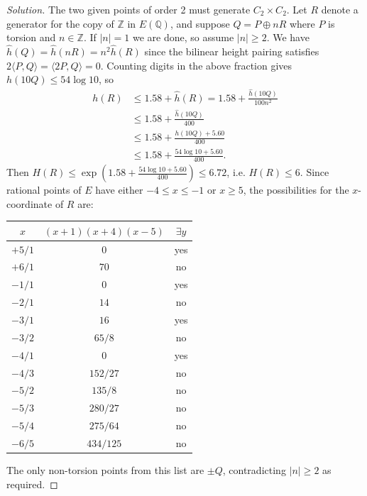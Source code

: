 \documentclass[a4paper]{article}
\theoremstyle{definition}
\newcommand{\Z}{\mathbb{Z}}
\newcommand{\Q}{\mathbb{Q}}
\begin{document}
\begin{enumerate}
        \begin{proof}[Solution]
            The two given points of order 2 must generate $C_2\times C_2$. Let
            $R$ denote a generator for the copy of $\Z$ in $E(\Q)$, and suppose
            $Q=P\oplus nR$ where $P$ is torsion and $n\in\Z$. If $|n|=1$ we are
            done, so assume $|n|\ge2$. We have
            $\hat h(Q)=\hat h(nR)=n^2\hat h(R)$ since the bilinear height
            pairing satisfies $2\langle P,Q\rangle=\langle2P,Q\rangle=0$.
            Counting digits in the above fraction gives $h(10Q)\le54\log10$, so
            \begin{align*}
                h(R)
                    &\le 1.58 + \hat h(R)
                    = 1.58 + \frac{\hat h(10Q)}{100n^2} \\
                    &\le 1.58 + \frac{\hat h(10Q)}{400} \\
                    &\le 1.58 + \frac{h(10Q) + 5.60}{400} \\
                    &\le 1.58 + \frac{54\log10+5.60}{400}.
            \end{align*}
            Then $H(R)\le\exp(1.58+\frac{54\log10+5.60}{400})\le6.72$, i.e.
            $H(R)\le6$. Since rational points of $E$ have either $-4\le x\le-1$
            or $x\ge5$, the possibilities for the $x$-coordinate of $R$ are:
            \begin{center}
                \begin{tabular}{|c|c|c|}
                    \hline
                    $x$ & $(x+1)(x+4)(x-5)$ & $\exists y$ \\
                    \hline
                    $+5/1$ & $0$ & yes \\
                    \hline
                    $+6/1$ & $70$ & no \\
                    \hline
                    $-1/1$ & $0$ & yes \\
                    \hline
                    $-2/1$ & $14$ & no \\
                    \hline
                    $-3/1$ & $16$ & yes \\
                    \hline
                    $-3/2$ & $65/8$ & no \\
                    \hline
                    $-4/1$ & $0$ & yes \\
                    \hline
                    $-4/3$ & $152/27$ & no \\
                    \hline
                    $-5/2$ & $135/8$ & no \\
                    \hline
                    $-5/3$ & $280/27$ & no \\
                    \hline
                    $-5/4$ & $275/64$ & no \\
                    \hline
                    $-6/5$ & $434/125$ & no \\
                    \hline
                \end{tabular}
            \end{center}
            The only non-torsion points from this list are $\pm Q$,
            contradicting $|n|\ge2$ as required.
        \end{proof}


\end{enumerate}
\end{document}
